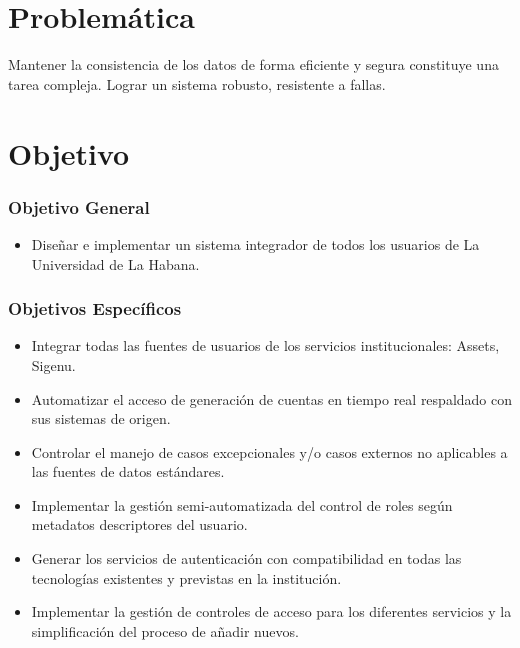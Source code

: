 \section*{Problemática}
Mantener la consistencia de los datos de forma eficiente y segura constituye una tarea compleja. Lograr un sistema robusto, resistente a fallas.

\section*{Objetivo}

\subsubsection*{Objetivo General}

\begin{itemize}	
	\item Diseñar e implementar un sistema integrador de todos los usuarios de La Universidad de La Habana. 
\end{itemize}

\subsubsection*{Objetivos Específicos}
\begin{itemize}	
	\item Integrar todas las fuentes de usuarios de los servicios institucionales: Assets, Sigenu.
	\item Automatizar el acceso de generación de cuentas en tiempo real respaldado con sus sistemas de origen.
	\item Controlar el manejo de casos excepcionales y/o casos externos no aplicables a las fuentes de datos estándares.
	\item Implementar la gestión semi-automatizada del control de roles según metadatos descriptores del usuario.
	\item Generar los servicios de autenticación con compatibilidad en todas las tecnologías existentes y previstas en la institución.
	\item Implementar la gestión de controles de acceso para los diferentes servicios y la simplificación del proceso de añadir nuevos.
\end{itemize}